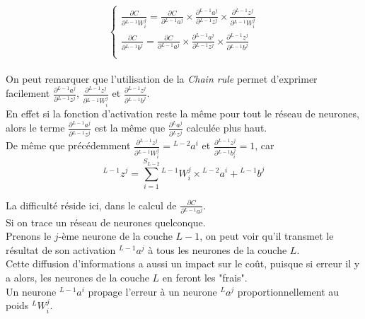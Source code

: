 \documentclass[10pt,a4paper]{report}
\newcommand{\lexp}[1]{\phantom{}^{#1}}
\newcommand{\elem}[4]{\lexp{#2}#1^{#3}_{#4}}
\begin{document}
				$$\left\{
				\begin{array}{l}
					\frac{\partial C}{\partial \elem{W}{L-1}{j}{i}} = \frac{\partial C}{\partial \elem{a}{L-1}{j}{}} \times \frac{\partial \elem{a}{L-1}{j}{}}{\partial \elem{z}{L-1}{j}{}} \times \frac{\partial \elem{z}{L-1}{j}{}}{\partial \elem{W}{L-1}{j}{i}}\\
					\frac{\partial C}{\partial \elem{b}{L-1}{j}{}} = \frac{\partial C}{\partial \elem{a}{L-1}{j}{}} \times \frac{\partial \elem{a}{L-1}{j}{}}{\partial \elem{z}{L-1}{j}{}} \times \frac{\partial \elem{z}{L-1}{j}{}}{\partial \elem{b}{L-1}{j}{}}\\
				\end{array}
				\right.$$\\
				
				On peut remarquer que l'utilisation de la \emph{Chain rule} permet d'exprimer facilement $\frac{\partial \elem{a}{L-1}{j}{}}{\partial \elem{z}{L-1}{j}{}}$, $\frac{\partial \elem{z}{L-1}{j}{}}{\partial \elem{W}{L-1}{j}{i}}$ et $\frac{\partial \elem{z}{L-1}{j}{}}{\partial \elem{b}{L-1}{j}{}}$.\\
				En effet si la fonction d'activation reste la même pour tout le réseau de neurones, alors le terme $\frac{\partial \elem{a}{L-1}{j}{}}{\partial \elem{z}{L-1}{j}{}}$ est la même que $\frac{\partial \elem{a}{L}{j}{}}{\partial \elem{z}{L}{j}{}}$ calculée plus haut.\\
				De même que précédemment $\frac{\partial \elem{z}{L-1}{j}{}}{\partial \elem{W}{L-1}{j}{i}}=\elem{a}{L-2}{i}{}$ et $\frac{\partial \elem{z}{L-1}{j}{}}{\partial \elem{b}{L-1}{j}{i}} = 1$, car
				$$\elem{z}{L-1}{j}{} = \sum_{i=1}^{S_{L-2}}{\elem{W}{L-1}{j}{i} \times \elem{a}{L-2}{i}{}} + \elem{b}{L-1}{j}{}$$
				
				La difficulté réside ici, dans le calcul de $\frac{\partial C}{\partial \elem{a}{L-1}{j}{}}$.\\
				Si on trace un réseau de neurones quelconque.\\
				Prenons le $j$-ème neurone de la couche $L-1$, on peut voir qu'il transmet le résultat de son activation $\elem{a}{L-1}{j}{}$ à tous les neurones de la couche $L$.\\
				Cette diffusion d'informations a aussi un impact sur le coût, puisque si erreur il y a alors, les neurones de la couche $L$ en feront les "frais".\\
				Un neurone $\elem{a}{L-1}{i}{}$ propage l'erreur à un neurone $\elem{a}{L}{j}{}$ proportionnellement au poids $\elem{W}{L}{j}{i}$.\\
				
\end{document}
